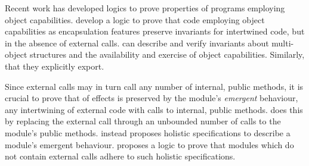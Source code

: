 Recent work has developed logics to prove properties of programs employing object capabilities.
\citet{ddd} develop a logic to prove that   code employing object
capabilities as encapsulation features preserve invariants for
intertwined code, but in the absence of external calls. 
  \citet{dd}  can describe and verify invariants
about multi-object structures and the availability and exercise of object capabilities.  %
 Similarly,
 that they explicitly export.




Since external calls may in turn call any number of internal, public methods, 
it is crucial  to prove that \taming of effects is preserved by the module's 
\emph{emergent} behaviour, \ie any intertwining of external code with calls to internal, public methods.
\citet{CassezFQ24} 
does this by replacing the external call through an unbounded number of calls to the module's public methods.
\citet{FASE} instead proposes holistic specifications to describe a module's emergent behaviour. 
\citet{OOPSLA22} proposes 
a logic to prove that modules which do not contain external calls adhere to such holistic specifications.



